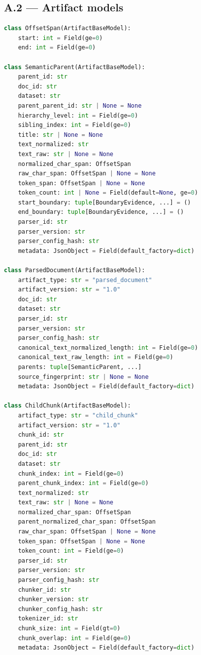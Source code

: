 \documentclass[11pt,a4paper]{article}
\begin{document}
\subsection{A.2 --- Artifact models}
\begin{lstlisting}[language=python]
class OffsetSpan(ArtifactBaseModel):
    start: int = Field(ge=0)
    end: int = Field(ge=0)

class SemanticParent(ArtifactBaseModel):
    parent_id: str
    doc_id: str
    dataset: str
    parent_parent_id: str | None = None
    hierarchy_level: int = Field(ge=0)
    sibling_index: int = Field(ge=0)
    title: str | None = None
    text_normalized: str
    text_raw: str | None = None
    normalized_char_span: OffsetSpan
    raw_char_span: OffsetSpan | None = None
    token_span: OffsetSpan | None = None
    token_count: int | None = Field(default=None, ge=0)
    start_boundary: tuple[BoundaryEvidence, ...] = ()
    end_boundary: tuple[BoundaryEvidence, ...] = ()
    parser_id: str
    parser_version: str
    parser_config_hash: str
    metadata: JsonObject = Field(default_factory=dict)

class ParsedDocument(ArtifactBaseModel):
    artifact_type: str = "parsed_document"
    artifact_version: str = "1.0"
    doc_id: str
    dataset: str
    parser_id: str
    parser_version: str
    parser_config_hash: str
    canonical_text_normalized_length: int = Field(ge=0)
    canonical_text_raw_length: int = Field(ge=0)
    parents: tuple[SemanticParent, ...]
    source_fingerprint: str | None = None
    metadata: JsonObject = Field(default_factory=dict)

class ChildChunk(ArtifactBaseModel):
    artifact_type: str = "child_chunk"
    artifact_version: str = "1.0"
    chunk_id: str
    parent_id: str
    doc_id: str
    dataset: str
    chunk_index: int = Field(ge=0)
    parent_chunk_index: int = Field(ge=0)
    text_normalized: str
    text_raw: str | None = None
    normalized_char_span: OffsetSpan
    parent_normalized_char_span: OffsetSpan
    raw_char_span: OffsetSpan | None = None
    token_span: OffsetSpan | None = None
    token_count: int = Field(ge=0)
    parser_id: str
    parser_version: str
    parser_config_hash: str
    chunker_id: str
    chunker_version: str
    chunker_config_hash: str
    tokenizer_id: str
    chunk_size: int = Field(gt=0)
    chunk_overlap: int = Field(ge=0)
    metadata: JsonObject = Field(default_factory=dict)
\end{lstlisting}
\end{document}
